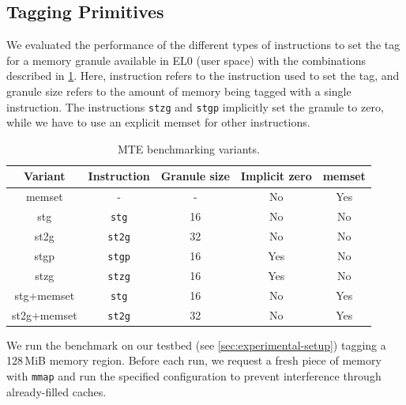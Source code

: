 \subsection{Tagging Primitives}
\label{subsec:tagging-primitives}

We evaluated the performance of the different types of instructions to set the tag for a memory granule available in EL0 (user space) with the combinations described in \cref{tab:stg-instructions}.
Here, instruction refers to the instruction used to set the tag, and granule size refers to the amount of memory being tagged with a single instruction.
The instructions \texttt{stzg} and \texttt{stgp} implicitly set the granule to zero, while we have to use an explicit memset for other instructions.

\begin{table}[h]
    \centering
    \small
    \begin{tabular}{c || c | c | c | c }
        \textbf{Variant} & \textbf{Instruction} & \textbf{Granule size} & \textbf{Implicit zero} & \textbf{memset} \\
        \hline
        memset           & -                    & -                     & No                     & Yes             \\
        stg              & \texttt{stg}         & 16                    & No                     & No              \\
        st2g             & \texttt{st2g}        & 32                    & No                     & No              \\
        stgp             & \texttt{stgp}        & 16                    & Yes                    & No              \\
        stzg             & \texttt{stzg}        & 16                    & Yes                    & No              \\
        stg+memset       & \texttt{stg}         & 16                    & No                     & Yes             \\
        st2g+memset      & \texttt{st2g}        & 32                    & No                     & Yes             \\
    \end{tabular}
    \caption{MTE benchmarking variants.}
    \label{tab:stg-instructions}
\end{table}

We run the benchmark on our testbed (see \cref{sec:experimental-setup}) tagging a 128\,MiB memory region.
Before each run, we request a fresh piece of memory with \texttt{mmap} and run the specified configuration to prevent interference through already-filled caches.

